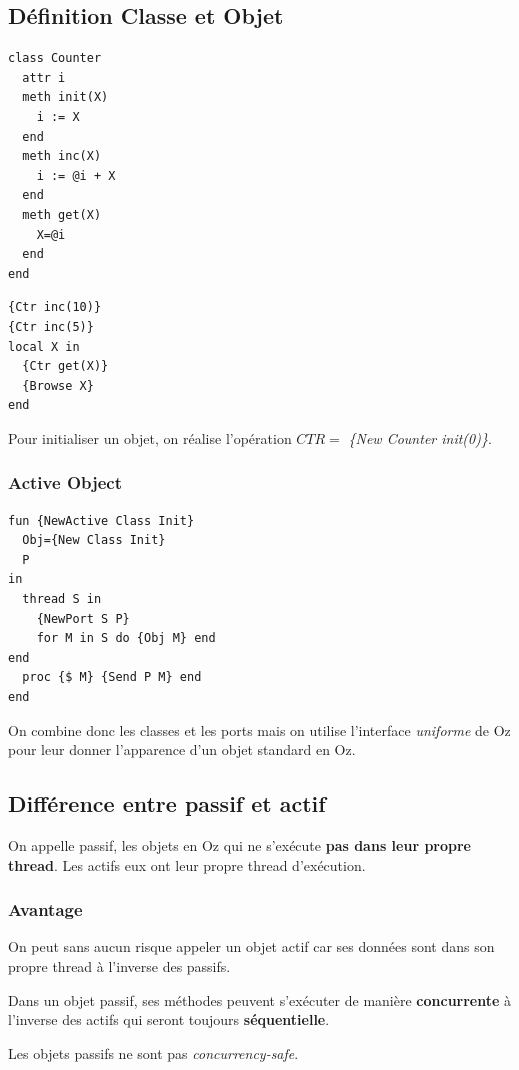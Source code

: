 \documentclass{report}
\begin{document}
\subsection{Définition Classe et Objet}
\begin{lstlisting}[escapechar=\%]
class Counter 
  attr i 
  meth init(X) 
    i := X
  end 
  meth inc(X) 
    i := @i + X
  end 
  meth get(X) 
    X=@i
  end
end
\end{lstlisting}
\begin{lstlisting}[escapechar=\%]
{Ctr inc(10)} 
{Ctr inc(5)} 
local X in 
  {Ctr get(X)} 
  {Browse X}
end
\end{lstlisting}
Pour initialiser un objet, on réalise l'opération $CTR=$ \textit{\{New Counter init(0)\}}.

\subsubsection{Active Object}
\begin{lstlisting}[escapechar=\%]
fun {NewActive Class Init} 
  Obj={New Class Init} 
  P
in
  thread S in 
    {NewPort S P} 
    for M in S do {Obj M} end
end 
  proc {$ M} {Send P M} end
end
\end{lstlisting}
On combine donc les classes et les ports mais on utilise l'interface \textit{uniforme} de Oz pour leur donner l'apparence d'un objet standard en Oz.

\subsection{Différence entre passif et actif}
On appelle passif, les objets en Oz qui ne s'exécute \textbf{pas dans leur propre thread}. Les actifs eux ont leur propre thread d'exécution.

\subsubsection{Avantage}
On peut sans aucun risque appeler un objet actif car ses données sont dans son propre thread à l'inverse des passifs. \par 
Dans un objet passif, ses méthodes peuvent s'exécuter de manière \textbf{concurrente} à l'inverse des actifs qui seront toujours \textbf{séquentielle}.\par 
Les objets passifs ne sont pas \textit{concurrency-safe}.

\newpage
\end{document}
